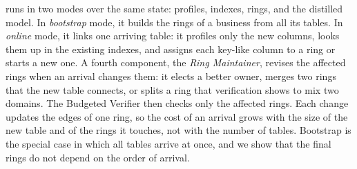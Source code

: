 \ourmethod runs in two modes over the same state: profiles, indexes, rings, and the distilled model.
In \emph{bootstrap} mode, it builds the rings of a business from all its tables.
In \emph{online} mode, it links one arriving table: it profiles only the new columns, looks them up in the existing indexes, and assigns each key-like column to a ring or starts a new one.
A fourth component, the \emph{Ring Maintainer}, revises the affected rings when an arrival changes them: it elects a better owner, merges two rings that the new table connects, or splits a ring that verification shows to mix two domains.
The Budgeted Verifier then checks only the affected rings.
Each change updates the edges of one ring, so the cost of an arrival grows with the size of the new table and of the rings it touches, not with the number of tables.
Bootstrap is the special case in which all tables arrive at once, and we show that the final rings do not depend on the order of arrival.

